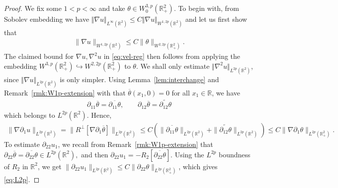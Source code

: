 \documentclass[10pt]{amsart}
\theoremstyle{definition}
\theoremstyle{remark}
\numberwithin{equation}{section}
\newcommand{\nrm}[1]{\Vert#1\Vert}
\newcommand{\rd}{\partial}
\newcommand{\nb}{\nabla}
\newcommand{\0}{\emptyset}
\newcommand{\tht}{\theta}
\newcommand{\bbR}{\mathbb R}
\begin{document}
	
	\begin{proof}
		We fix some $1<p<\infty$ and take $\theta \in W^{3,p}_0(\bbR^2_{+})$. To begin with, from Sobolev embedding we have $\nrm{\nb u}_{L^\infty(\bbR^2)} \le C\nrm{\nb u}_{W^{1,2p}(\bbR^2)}$ and let us first show that \begin{equation}\label{eq:L2p}
			\begin{aligned}
				\| \nabla u \|_{W^{1,2p}(\bbR^2)} \leq C \| \tht \|_{W^{2,2p}(\bbR^2_{+})}. 
			\end{aligned}
		\end{equation} The claimed bound for $\nb u, \nb^2 u$ in \eqref{eq:vel-reg} then follows from applying the embedding $W^{3,p}(\bbR^2_{+}) \hookrightarrow W^{2,2p}(\bbR^2_{+})$ to $\tht$. We shall only estimate $\nrm{\nb^2 u}_{L^{2p}(\bbR^2)}$, since $\nrm{\nb u}_{L^{2p}(\bbR^2)}$ is only simpler. Using Lemma~\ref{lem:interchange} and Remark~\ref{rmk:W1p-extension}  with that $\overline{\tht}(x_1,0) = 0$ for all $x_1 \in \bbR$, we have \begin{equation*}
			\begin{aligned}
				\rd_{11}\overline{\tht} = \overline{\rd_{11}\tht}, \qquad \rd_{12}\overline{\tht} = \widetilde{\rd_{12}\tht}
			\end{aligned}
		\end{equation*} which belongs to $L^{2p}(\bbR^2)$. Hence, \begin{equation*}
			\begin{aligned}
				\| \nabla \rd_{1} u \|_{L^{2p}(\bbR^2)} = \| R^{\perp} [\nabla \rd_{1} \overline{\tht}] \|_{L^{2p}(\bbR^2)} \leq C (\| \overline{\rd_{11} \tht} \|_{L^{2p}(\bbR^2)} + \| \widetilde{\rd_{12} \tht} \|_{L^{2p}(\bbR^2)}) \leq C \| \nabla \rd_{1} \tht \|_{L^{2p}(\bbR^2_{+})}.
			\end{aligned}
		\end{equation*} To estimate $\rd_{22}u_1$, we recall from Remark~\ref{rmk:W1p-extension} that $\rd_{22}\overline{\tht} = \overline{\rd_{22}\tht} \in L^{2p}(\bbR^2),$ and then $\rd_{22} u_{1} = -R_{2} [\overline{\rd_{22}\tht}] $. Using the $L^{2p}$ boundness of $R_{2}$ in $\bbR^{2}$, we get $\| \rd_{22} u_{1} \|_{L^{2p}(\bbR^2)} \leq C \| \rd_{22} \tht \|_{L^{2p}(\bbR^2_{+})}$, which gives \eqref{eq:L2p}. 
		
		
		

\end{proof}
\end{document}
